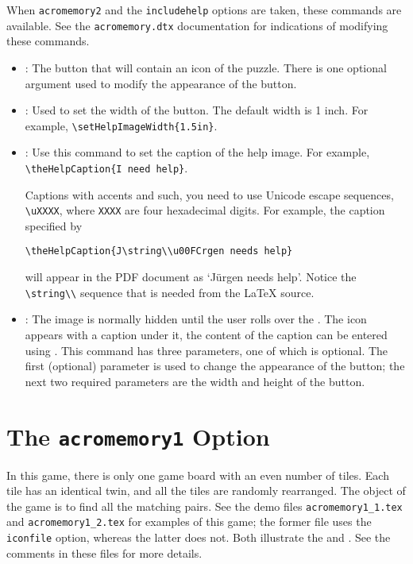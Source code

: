 \documentclass{article}
\begin{document}
\newtopic When \texttt{acromemory2} and the \texttt{includehelp}
options are taken, these commands are available. See the
\texttt{acromemory.dtx} documentation for indications of modifying
these commands.

\begin{itemize}
\item {}: The button that will contain an icon of the
puzzle. There is one optional argument used to modify the appearance
of the button.

\item {}: Used to set the width of the
 button. The default width is 1 inch. For example,
\verb!\setHelpImageWidth{1.5in}!.

\item {}: Use this command to set the caption of
the help image. For example, \verb!\theHelpCaption{I need help}!.

Captions with accents and such, you need to use Unicode escape
sequences, \verb!\uXXXX!, where \texttt{XXXX} are four hexadecimal
digits. For example, the caption specified by
\begin{Verbatim}[xleftmargin=20pt,fontsize=\fontsize{9}{11}\selectfont]
\theHelpCaption{J\string\\u00FCrgen needs help}
\end{Verbatim}
will appear in the PDF document as `J\"{u}rgen needs help'. Notice the
\verb!\string\\! sequence that is needed from the {\LaTeX} source.


\item{}: The image is normally hidden until the
user rolls over the . The icon appears with a
caption under it, the content of the caption can be entered using
. This command has three parameters, one of which
is optional. The first (optional) parameter is used to change the
appearance of the button; the next two required parameters are the
width and height of the button.
\end{itemize}


\section{The \texttt{acromemory1} Option}

In this game, there is only one game board with an even number of
tiles. Each tile has an identical twin, and all the tiles are
randomly rearranged. The object of the game is to find all the
matching pairs. See the demo files \texttt{acromemory1\_1.tex} and
\texttt{acromemory1\_2.tex} for examples of this game; the former
file uses the \texttt{iconfile} option, whereas the latter does not.
Both illustrate the  and
. See the comments in these files for more
details.
\end{document}
